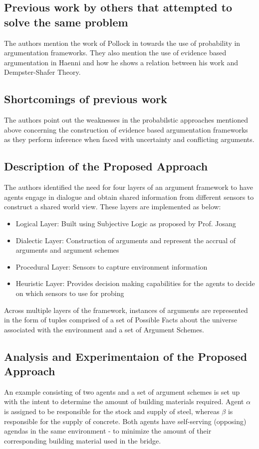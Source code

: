 \documentclass[UTF8]{article}
\begin{document}
\subsection{Previous work by others that attempted to solve the same problem}
The authors mention the work of Pollock in \cite{Pollock:1995:CCB:526901} towards the use of probability in argumentation frameworks. They also mention the use of evidence based argumentation in Haenni \cite{Haenni2005TowardsAU} and how he shows a relation between his work and Dempster-Shafer Theory.

\subsection{Shortcomings of previous work}
The authors point out the weaknesses in the probabilstic approaches mentioned above concerning the construction of evidence based argumentation frameworks as they perform 
inference when faced with uncertainty and conflicting arguments. 

\subsection{Description of the Proposed Approach}
The authors identified the need for four layers of an argument framework to have agents engage in dialogue 
and obtain shared information from different sensors to construct a shared world view. These layers are implemented as below:
\begin{itemize}
  \item Logical Layer: Built using Subjective Logic as proposed by Prof. Josang
  \item Dialectic Layer: Construction of arguments and represent the accrual of arguments and argument schemes
  \item Procedural Layer: Sensors to capture environment information
  \item Heuristic Layer: Provides decision making capabilities for the agents to decide on which sensors to use for probing
\end{itemize}

Across multiple layers of the framework, instances of arguments are represented in the form 
of tuples comprised of a set of Possible Facts about the universe associated with the environment and a set of Argument Schemes.

\subsection{Analysis and Experimentaion of the Proposed Approach}
An example consisting of two agents and a set of argument schemes is set up with the intent to determine the amount of building materials required. Agent $\alpha$ is 
assigned to be responsible for the stock and supply of steel, whereas $\beta$ is responsible for the supply of concrete. Both agents have self-serving (opposing) 
agendas in the same environment - to minimize the amount of their corresponding building material used in the bridge.
\end{document}

